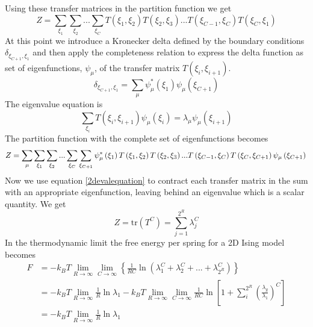 %
Using these transfer matrices in the partition function we get
%
\begin{equation}
Z=\sum_{\xi_1}\sum_{\xi_2}...\sum_{\xi_C}T\left(\xi_1,\xi_2\right)T\left(\xi_2,\xi_3\right)...T\left(\xi_{C-1},\xi_C\right)T\left(\xi_C,\xi_{1}\right) \label{tm_torus}
\end{equation}
%
At this point we introduce a Kronecker delta defined by the boundary conditions $\delta_{\xi_{C+1},\xi_{1} }$ and then apply the completeness relation to express the delta function as set of eigenfunctions, $\psi_{\mu}$, of the transfer matrix $T\left(\xi_i,\xi_{i+1}\right)$.
%
\begin{equation}
\delta_{\xi_{C+1},\xi_{1} }=\sum_{\mu}\psi_{\mu}^{*}\left(\xi_{1} \right)\psi_{\mu}\left(\xi_{C+1}\right)
\end{equation}
%
The eigenvalue equation is
%
\begin{equation}\label{2devalequation}
\sum_{\xi_{i}}T\left(\xi_i,\xi_{i+1}\right)\psi_{\mu}\left(\xi_{i}\right) = \lambda_{\mu}\psi_{\mu}\left(\xi_{i+1}\right)
\end{equation}
%
The partition function with the complete set of eigenfunctions becomes
%
\begin{equation}
Z=\sum_{\mu}\sum_{\xi_1}\sum_{\xi_2}...\sum_{\xi_C}\sum_{\xi_{C+1}}\psi_{\mu}^{*}\left(\xi_{1} \right)T\left(\xi_1,\xi_2\right)T\left(\xi_2,\xi_3\right)...T\left(\xi_{C-1},\xi_C\right)T\left(\xi_C,\xi_{C+1}\right)\psi_{\mu}\left(\xi_{C+1}\right)\\
\end{equation}
%
Now we use equation \eqref{2devalequation} to contract each transfer matrix in the sum with an appropriate eigenfunction, leaving behind an eigenvalue which is a scalar quantity. We get
%
\begin{equation}
Z=\mbox{tr}\left(T^{C}\right)=\sum_{j=1}^{2^{R}} \lambda_{j}^{C}
\end{equation}
%
In the thermodynamic limit the free energy per spring for a 2D Ising model becomes
%
\begin{align}
F&=-k_{B}T\lim_{R\to\infty}\lim_{C\to\infty}\left\{\frac{1}{RC}\ln \left(\lambda^{C}_{1} + \lambda^{C}_{2} + ... + \lambda^{C}_{2^{R}}\right)\right\} \\
&= -k_{B}T\lim_{R\to\infty}\frac{1}{R}\ln\lambda_{1} - k_{B}T\lim_{R\to\infty}\lim_{C\to\infty}\frac{1}{RC}\ln\left[1+\sum_{i}^{2^R}\left(\frac{\lambda_{g}}{\lambda_{1}}\right)^{C}\right]\\
&= -k_{B}T\lim_{R\to\infty}\frac{1}{R} \ln \lambda_{1}
\end{align}

